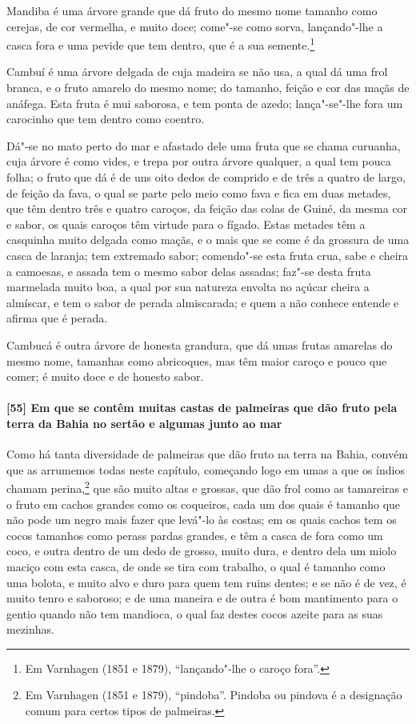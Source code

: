 \begin{linenumbers}
Mandiba é uma árvore grande que dá fruto do mesmo nome tamanho como cerejas, de cor
vermelha, e muito doce; come"-se como sorva, lançando"-lhe a casca fora e uma pevide que tem
dentro, que é a sua semente.\footnote{ Em Varnhagen (1851 e 1879), ``lançando"-lhe o caroço
fora''.}

Cambuí é uma árvore delgada de cuja madeira se não usa, a qual dá uma frol branca, e o
fruto amarelo do mesmo nome; do tamanho, feição e cor das maçãs de anáfega. Esta fruta é
mui saborosa, e tem ponta de azedo; lança"-se"-lhe fora um carocinho que tem dentro como
coentro.

Dá"-se no mato perto do mar e afastado dele uma fruta que se chama curuanha, cuja árvore é
como vides, e trepa por outra árvore qualquer, a qual tem pouca folha; o fruto que dá é de
uns oito dedos de comprido e de três a quatro de largo, de feição da fava, o qual se parte
pelo meio como fava e fica em duas metades, que têm dentro três e quatro caroços, da
feição das colas de Guiné, da mesma cor e sabor, os quais caroços têm virtude para o
fígado. Estas metades têm a casquinha muito delgada como maçãs, e o mais que se come é da
grossura de uma casca de laranja; tem extremado sabor; comendo"-se esta fruta crua, sabe e
cheira a camoesas, e assada tem o mesmo sabor delas assadas; faz"-se desta fruta marmelada
muito boa, a qual por sua natureza envolta no açúcar cheira a almíscar, e tem o sabor de
perada almiscarada; e quem a não conhece entende e afirma que é perada.

Cambucá é outra árvore de honesta grandura, que dá umas frutas amarelas do mesmo nome,
tamanhas como abricoques, mas têm maior caroço e pouco que comer; é muito doce e de
honesto sabor.

\paragraph{[55] Em que se contêm muitas castas de palmeiras que dão fruto pela terra da
Bahia no sertão e algumas junto ao mar}\quad
Como há tanta diversidade de palmeiras que dão fruto na terra na Bahia, convém que as
arrumemos todas neste capítulo, começando logo em umas a que os índios chamam
perina,\footnote{ Em Varnhagen (1851 e 1879), ``pindoba''. Pindoba ou pindova é a
designação comum para certos tipos de palmeiras.} que são muito altas e grossas, que dão
frol como as tamareiras e o fruto em cachos grandes como os coqueiros, cada um dos quais é
tamanho que não pode um negro mais fazer que levá"-lo às costas; em os quais cachos tem os
cocos tamanhos como perass pardas grandes, e têm a casca de fora como um coco, e outra
dentro de um dedo de grosso, muito dura, e dentro dela um miolo maciço com esta casca, de
onde se tira com trabalho, o qual é tamanho como uma bolota, e muito alvo e duro para quem
tem ruins dentes; e se não é de vez, é muito tenro e saboroso; e de uma maneira e de outra
é bom mantimento para o gentio quando não tem mandioca, o qual faz destes cocos azeite
para as suas mezinhas.


\end{linenumbers}
